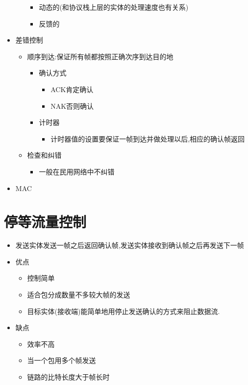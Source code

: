\documentclass[a4paper,12pt,notitlepage]{article}
\begin{document}
\begin{itemize}
\begin{itemize}
		\begin{itemize}
			\item 动态的(和协议栈上层的实体的处理速度也有关系)
			\item 反馈的
		\end{itemize}
	\end{itemize}
	\item 差错控制
	\begin{itemize}
		\item 顺序到达:保证所有帧都按照正确次序到达目的地
		\begin{itemize}
			\item 确认方式
			\begin{itemize}
				\item ACK肯定确认
				\item NAK否则确认
			\end{itemize}
			\item 计时器
			\begin{itemize}
				\item 计时器值的设置要保证一帧到达并做处理以后,相应的确认帧返回
			\end{itemize}
		\end{itemize}
		\item 检查和纠错
		\begin{itemize}
			\item 一般在民用网络中不纠错
		\end{itemize}
	\end{itemize}
	\item MAC
\end{itemize} 

\section{停等流量控制}
\begin{itemize}
	\item 发送实体发送一帧之后返回确认帧,发送实体接收到确认帧之后再发送下一帧
	\item 优点
	\begin{itemize}
		\item 控制简单
		\item 适合包分成数量不多较大帧的发送
		\item 目标实体(接收端)能简单地用停止发送确认的方式来阻止数据流.
	\end{itemize}
	\item 缺点
	\begin{itemize}
		\item 效率不高
		\item 当一个包用多个帧发送
		\item 链路的比特长度大于帧长时
	\end{itemize}
\end{itemize}
\end{document}
